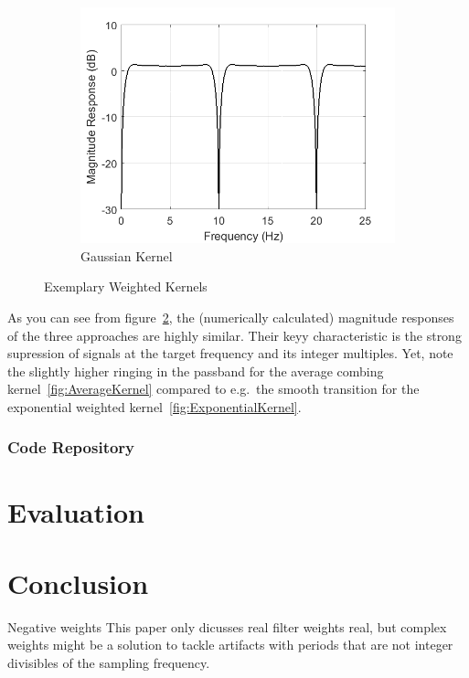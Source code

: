 \documentclass[a4paper]{article}
\begin{document}
\begin{figure}[hbtp]
\begin{subfigure}{.245\textwidth}
        \includegraphics[width=\textwidth]{img/mag_gauss.png}
        \caption{Gaussian Kernel}\label{fig:GaussKernel}
    \end{subfigure}
    \caption{Exemplary Weighted Kernels}\label{fig:ExemplaryKernels}
\end{figure}

As you can see from figure~\ref{fig:ExemplaryKernels}, the (numerically calculated) magnitude responses of the three approaches are highly similar.
Their keyy characteristic is the strong supression of signals at the target frequency and its integer multiples.
Yet, note the slightly higher ringing in the passband for the average combing kernel~\ref{fig:AverageKernel} compared to e.g.\ the smooth transition for the exponential weighted kernel~\ref{fig:ExponentialKernel}.

\subsubsection{Code Repository}











\section{Evaluation}

\section{Conclusion}


Negative weights
This paper only dicusses real filter weights real, but complex weights might be a solution to tackle artifacts with periods that are not integer divisibles of the sampling frequency.



\end{document}

